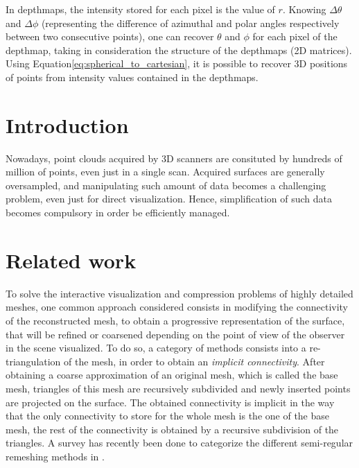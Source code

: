 \documentclass[11pt,fleqn]{book} %
\begin{document}
In depthmaps, the intensity stored for each pixel is the value of $r$. Knowing $\Delta\theta$ and $\Delta\phi$ (representing the difference of azimuthal and polar angles respectively between two consecutive points), one can recover $\theta$ and $\phi$ for each pixel of the depthmap, taking in consideration the structure of the depthmaps (2D matrices). 
Using Equation\eqref{eq:spherical_to_cartesian}, it is possible to recover 3D positions of points from intensity values contained in the depthmaps.

\section{Introduction}
\label{sec:introduction}

Nowadays, point clouds acquired by 3D scanners are consituted by hundreds of million of points, even just in a single scan.
Acquired surfaces are generally oversampled, and manipulating such amount of data becomes a challenging problem, even just for direct visualization.
Hence, simplification of such data becomes compulsory in order be efficiently managed.

\section{Related work}
\label{sec:related_work}

To solve the interactive visualization and compression problems of highly detailed meshes, one common approach considered consists in modifying the connectivity of the reconstructed mesh, to obtain a progressive representation of the surface, that will be refined or coarsened depending on the point of view of the observer in the scene visualized.
To do so, a category of methods consists into a re-triangulation of the mesh, in order to obtain an \textit{implicit connectivity}. 
After obtaining a coarse approximation of an original mesh, which is called the base mesh, triangles of this mesh are recursively subdivided and newly inserted points are projected on the surface.
The obtained connectivity is implicit in the way that the only connectivity to store for the whole mesh is the one of the base mesh, the rest of the connectivity is obtained by a recursive subdivision of the triangles.
A survey has recently been done to categorize the different semi-regular remeshing methods in \cite{PRS15}.
\end{document}
